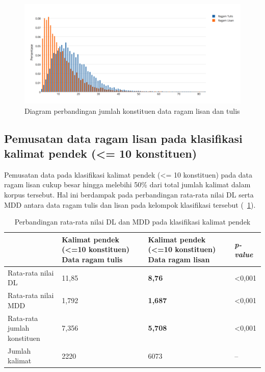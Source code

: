 \begin{figure}
	\centering \includegraphics[width=1
	\textwidth] {pics/Jumlah_kata.png} 
	\caption{Diagram perbandingan jumlah konstituen data ragam lisan dan tulis} 
	\label{fig:jumlah_kata} 
\end{figure}

\subsection{Pemusatan data ragam lisan pada klasifikasi kalimat pendek (\textless= 10 konstituen)}
Pemusatan data pada klasifikasi kalimat pendek (\textless= 10 konstituen) pada data ragam lisan cukup besar hingga melebihi 50\% dari total jumlah kalimat dalam korpus tersebut. Hal ini berdampak pada perbandingan rata-rata nilai DL serta MDD antara data ragam tulis dan lisan pada kelompok klasifikasi tersebut (\tab~\ref{tab:DL_MDD_pendek}).

\begin{table}
\begin{center}
\begin{small}
\caption{Perbandingan rata-rata nilai DL dan MDD pada klasifikasi kalimat pendek }\label{tab:DL_MDD_pendek}
  \begin{tabular}{ | p{3.2cm} | p{3.2cm} | p{3.2cm} | p{2cm} |}
    \hline
 & Kalimat pendek \newline (\textless =10 konstituen) \newline Data ragam tulis & Kalimat pendek \newline (\textless =10 konstituen) \newline Data ragam lisan & \textit{p-value} \\ \hline
 Rata-rata nilai DL & 11,85 & \textbf{8,76} & \textless 0,001 \\ \hline
 Rata-rata nilai MDD & 1,792 & \textbf{1,687} & \textless 0,001 \\ \hline
 Rata-rata jumlah konstituen & 7,356 & \textbf{5,708} & \textless 0,001 \\ \hline
 Jumlah kalimat & 2220 & 6073 & -- \\ \hline
   \end{tabular}
   \end{small}
\end{center}
\end{table}


